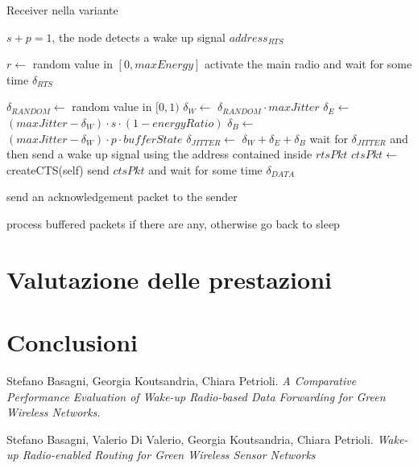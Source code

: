 \documentclass[binding=0.6cm,TFA]{sapthesis}
\begin{document}
\begin{algorithm}
    \caption{Receiver nella variante}
    \begin{algorithmic}
        \REQUIRE $s+p=1$, the node detects a wake up signal $address_{RTS}$

            \STATE $r \leftarrow$ random value in $[0,maxEnergy]$
                \STATE activate the main radio and wait for some time $\delta_{RTS}$


                    \STATE $\delta_{RANDOM} \leftarrow$ random value in $[0,1)$
                    \STATE $\delta_{W} \leftarrow$ $\delta_{RANDOM} \cdot maxJitter$
                    \STATE $\delta_{E} \leftarrow$ $(maxJitter-\delta_{W}) \cdot s \cdot (1 - energyRatio)$
                    \STATE $\delta_{B} \leftarrow$ $(maxJitter-\delta_{W}) \cdot p \cdot bufferState$
                    \STATE $\delta_{JITTER} \leftarrow$ $\delta_{W} + \delta_{E} + \delta_{B}$
                    \STATE wait for $\delta_{JITTER}$ and then send a wake up signal using the address contained inside $rtsPkt$
                    \STATE $ctsPkt \leftarrow$ createCTS(self)
                    \STATE send $ctsPkt$ and wait for some time $\delta_{DATA}$

                        \STATE send an acknowledgement packet to the sender
                    \ENDIF
                \ENDIF

                \STATE process buffered packets if there are any, otherwise go back to sleep
            \ENDIF
        
    \end{algorithmic}
\end{algorithm}

\chapter{Valutazione delle prestazioni}
\chapter{Conclusioni}

\backmatter
\cleardoublepage
{} %

\begin{thebibliography}{9}

    Stefano Basagni, Georgia Koutsandria, Chiara Petrioli.
    \textit{A Comparative Performance Evaluation of Wake-up Radio-based Data Forwarding for Green Wireless Networks}.

    Stefano Basagni, Valerio Di Valerio, Georgia Koutsandria, Chiara Petrioli.
    \textit{Wake-up Radio-enabled Routing for Green Wireless Sensor Networks}
\end{thebibliography}
\end{document}
